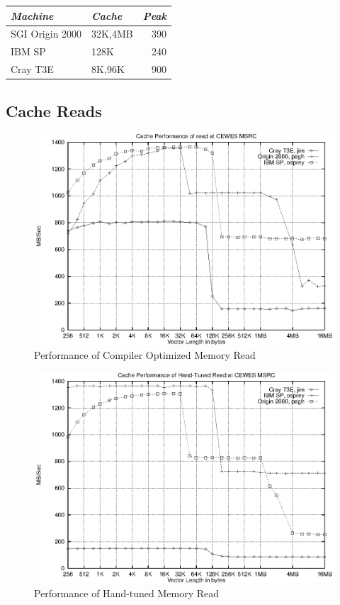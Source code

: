 \documentclass [12pt]{article}
\begin{document}
\begin{center}
\begin{tabular}{|l|l|r|} \hline
{\em Machine} & {\em Cache } & {\em Peak}\\ \hline
SGI Origin 2000 & 32K,4MB & 390 \\ \hline
IBM SP & 128K & 240 \\ \hline
Cray T3E & 8K,96K & 900 \\ \hline
\end{tabular}
\end{center}

\clearpage
\newpage

\subsection{Cache Reads}
\begin{figure}[Hht]
\centerline{\includegraphics{pics/cache_cewes_read.ps}}
\caption{Performance of Compiler Optimized Memory Read}\label{read}
\end{figure}

\begin{figure}[Hht]
\centerline{\includegraphics{pics/cache_cewes_handread.ps}}
\caption{Performance of Hand-tuned Memory Read}\label{handread}
\end{figure}
\end{document}
